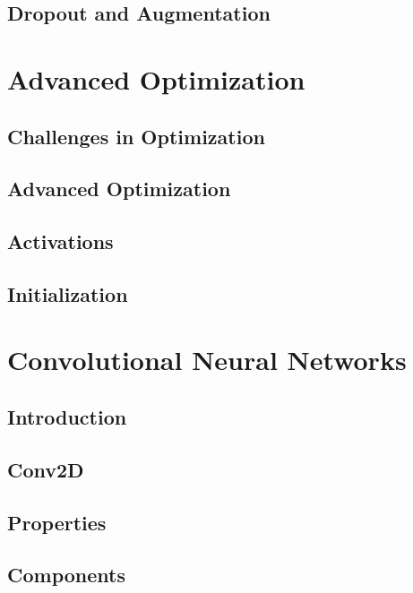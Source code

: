 \documentclass[13pt,compress]{beamer}
\begin{document}
\subsection{Dropout and Augmentation}

\section{Advanced Optimization}
\subsection{Challenges in Optimization}

\subsection{Advanced Optimization}

\subsection{Activations}

\subsection{Initialization}

\section{Convolutional Neural Networks}
\subsection{Introduction}
 
\subsection{Conv2D}
 
\subsection{Properties}
 
\subsection{Components}
 
\end{document}
